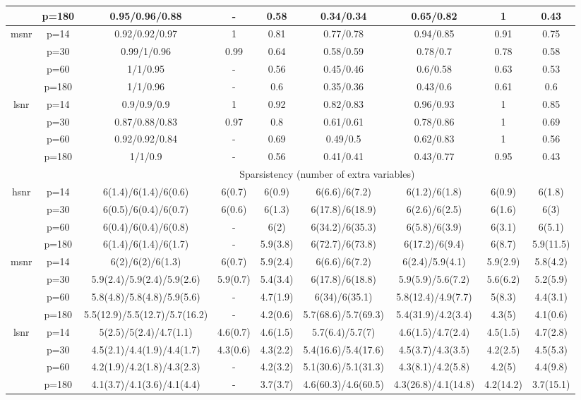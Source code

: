 \begin{table}[ht]
{\begin{tabular}{|c|c|ccccccc|}
   & p=180 & 0.95/0.96/0.88 & - & 0.58 & 0.34/0.34 & 0.65/0.82 & 1 & 0.43 \\ 
  \midrule\multirow{4}[2]{*}{msnr} & p=14 & 0.92/0.92/0.97 & 1 & 0.81 & 0.77/0.78 & 0.94/0.85 & 0.91 & 0.75 \\ 
   & p=30 & 0.99/1/0.96 & 0.99 & 0.64 & 0.58/0.59 & 0.78/0.7 & 0.78 & 0.58 \\ 
   & p=60 & 1/1/0.95 & - & 0.56 & 0.45/0.46 & 0.6/0.58 & 0.63 & 0.53 \\ 
   & p=180 & 1/1/0.96 & - & 0.6 & 0.35/0.36 & 0.43/0.6 & 0.61 & 0.6 \\ 
  \midrule\multirow{4}[2]{*}{lsnr} & p=14 & 0.9/0.9/0.9 & 1 & 0.92 & 0.82/0.83 & 0.96/0.93 & 1 & 0.85 \\ 
   & p=30 & 0.87/0.88/0.83 & 0.97 & 0.8 & 0.61/0.61 & 0.78/0.86 & 1 & 0.69 \\ 
   & p=60 & 0.92/0.92/0.84 & - & 0.69 & 0.49/0.5 & 0.62/0.83 & 1 & 0.56 \\ 
   & p=180 & 1/1/0.9 & - & 0.56 & 0.41/0.41 & 0.43/0.77 & 0.95 & 0.43 \\ 
   \midrule 
 \multicolumn{1}{|c}{} &       & \multicolumn{7}{c|}{Sparsistency (number of extra variables)} \\
\midrule\multirow{4}[2]{*}{hsnr} & p=14 & 6(1.4)/6(1.4)/6(0.6) & 6(0.7) & 6(0.9) & 6(6.6)/6(7.2) & 6(1.2)/6(1.8) & 6(0.9) & 6(1.8) \\ 
   & p=30 & 6(0.5)/6(0.4)/6(0.7) & 6(0.6) & 6(1.3) & 6(17.8)/6(18.9) & 6(2.6)/6(2.5) & 6(1.6) & 6(3) \\ 
   & p=60 & 6(0.4)/6(0.4)/6(0.8) & - & 6(2) & 6(34.2)/6(35.3) & 6(5.8)/6(3.9) & 6(3.1) & 6(5.1) \\ 
   & p=180 & 6(1.4)/6(1.4)/6(1.7) & - & 5.9(3.8) & 6(72.7)/6(73.8) & 6(17.2)/6(9.4) & 6(8.7) & 5.9(11.5) \\ 
  \midrule\multirow{4}[2]{*}{msnr} & p=14 & 6(2)/6(2)/6(1.3) & 6(0.7) & 5.9(2.4) & 6(6.6)/6(7.2) & 6(2.4)/5.9(4.1) & 5.9(2.9) & 5.8(4.2) \\ 
   & p=30 & 5.9(2.4)/5.9(2.4)/5.9(2.6) & 5.9(0.7) & 5.4(3.4) & 6(17.8)/6(18.8) & 5.9(5.9)/5.6(7.2) & 5.6(6.2) & 5.2(5.9) \\ 
   & p=60 & 5.8(4.8)/5.8(4.8)/5.9(5.6) & - & 4.7(1.9) & 6(34)/6(35.1) & 5.8(12.4)/4.9(7.7) & 5(8.3) & 4.4(3.1) \\ 
   & p=180 & 5.5(12.9)/5.5(12.7)/5.7(16.2) & - & 4.2(0.6) & 5.7(68.6)/5.7(69.3) & 5.4(31.9)/4.2(3.4) & 4.3(5) & 4.1(0.6) \\ 
  \midrule\multirow{4}[2]{*}{lsnr} & p=14 & 5(2.5)/5(2.4)/4.7(1.1) & 4.6(0.7) & 4.6(1.5) & 5.7(6.4)/5.7(7) & 4.6(1.5)/4.7(2.4) & 4.5(1.5) & 4.7(2.8) \\ 
   & p=30 & 4.5(2.1)/4.4(1.9)/4.4(1.7) & 4.3(0.6) & 4.3(2.2) & 5.4(16.6)/5.4(17.6) & 4.5(3.7)/4.3(3.5) & 4.2(2.5) & 4.5(5.3) \\ 
   & p=60 & 4.2(1.9)/4.2(1.8)/4.3(2.3) & - & 4.2(3.2) & 5.1(30.6)/5.1(31.3) & 4.3(8.1)/4.2(5.8) & 4.2(5) & 4.4(9.8) \\ 
   & p=180 & 4.1(3.7)/4.1(3.6)/4.1(4.4) & - & 3.7(3.7) & 4.6(60.3)/4.6(60.5) & 4.3(26.8)/4.1(14.8) & 4.2(14.2) & 3.7(15.1) \\ 
   \bottomrule 
\end{tabular}
}
\end{table}

